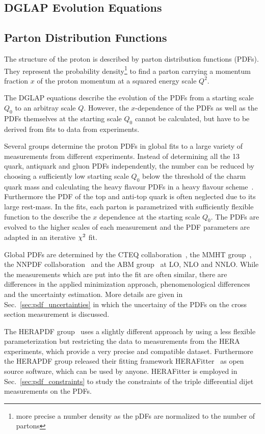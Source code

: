 \subsection{DGLAP Evolution Equations}


\subsection{Parton Distribution Functions}

The structure of the proton is described by parton distribution functions
(PDFs).
They represent the probability density\footnote{more precise a number density as
the pDFs are normalized to the number of partons} to find a parton carrying a momentum
fraction $x$ of the proton momentum at a squared energy scale $Q^2$. 

The DGLAP equations describe the evolution of the PDFs from a starting scale
$Q_0$ to an arbitray scale $Q$. However, the $x$-dependence of the PDFs as well
as the PDFs themselves at the starting scale $Q_0$ cannot be calculated, but
have to be derived from fits to data from experiments.

Several groups determine the proton PDFs in global fits to a large variety of
measurements from different experiments. Instead of determining all the 13 quark,
antiquark and gluon PDFs independently, the number can be reduced by choosing a
sufficiently low starting scale $Q_0$ below the threshold of the charm quark
mass and calculating the heavy flavour PDFs in a heavy flavour
scheme~\cite{rt_scheme}. Furthermore the PDF of the top and anti-top quark is
often neglected due to its large rest-mass. In the fits, each parton is
parametrized with sufficiently flexible function to the describe the $x$
dependence at the starting scale $Q_0$. The PDFs are evolved to the higher
scales of each measurement and the PDF parameters are adapted in an iterative
$\chi^2$ fit.

Global PDFs are determined by the CTEQ collaboration~\cite{Dulat:2015mca}, the
MMHT group~\cite{Harland-Lang:2014zoa}, the NNPDF
collaboration~\cite{Ball:2014uwa} and the ABM group~\cite{Alekhin:2013nda} at
LO, NLO and NNLO. While the measurements which are put into the fit are often
similar, there are differences in the applied minimization approach,
phenomenological differences and the uncertainty estimation. More details are
given in Sec.~\ref{sec:pdf_uncertainties} in which the uncertainy of the PDFs on
the cross section measurement is discussed.

The HERAPDF group~\cite{Abramowicz:2015mha} uses a slightly different approach
by using a less flexible parameterization but restricting the data to
measurements from the HERA experiments, which provide a very precise and
compatible dataset. Furthermore the HERAPDF group released their fitting
framework HERAFitter~\cite{Alekhin:2014irh} as open source software, which can
be used by anyone.  HERAFitter is employed in Sec.~\ref{sec:pdf_constraints} to
study the constraints of the triple differential dijet measurements on the PDFs.

